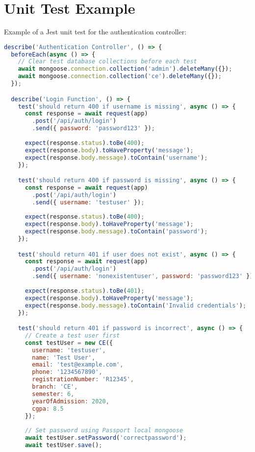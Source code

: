 \documentclass[12pt,a4paper]{report}
\begin{document}
\section{Unit Test Example}
Example of a Jest unit test for the authentication controller:

\begin{lstlisting}[language=JavaScript, caption=Authentication Controller Test]
describe('Authentication Controller', () => {
  beforeEach(async () => {
    // Clear test database collections before each test
    await mongoose.connection.collection('admin').deleteMany({});
    await mongoose.connection.collection('ce').deleteMany({});
  });

  describe('Login Function', () => {
    test('should return 400 if username is missing', async () => {
      const response = await request(app)
        .post('/api/auth/login')
        .send({ password: 'password123' });
      
      expect(response.status).toBe(400);
      expect(response.body).toHaveProperty('message');
      expect(response.body.message).toContain('username');
    });

    test('should return 400 if password is missing', async () => {
      const response = await request(app)
        .post('/api/auth/login')
        .send({ username: 'testuser' });
      
      expect(response.status).toBe(400);
      expect(response.body).toHaveProperty('message');
      expect(response.body.message).toContain('password');
    });

    test('should return 401 if user does not exist', async () => {
      const response = await request(app)
        .post('/api/auth/login')
        .send({ username: 'nonexistentuser', password: 'password123' });
      
      expect(response.status).toBe(401);
      expect(response.body).toHaveProperty('message');
      expect(response.body.message).toContain('Invalid credentials');
    });

    test('should return 401 if password is incorrect', async () => {
      // Create a test user first
      const testUser = new CE({
        username: 'testuser',
        name: 'Test User',
        email: 'test@example.com',
        phone: '1234567890',
        registrationNumber: 'R12345',
        branch: 'CE',
        semester: 6,
        yearOfAdmission: 2020,
        cgpa: 8.5
      });
      
      // Set password using Passport local mongoose
      await testUser.setPassword('correctpassword');
      await testUser.save();
      

\end{lstlisting}
\end{document}
